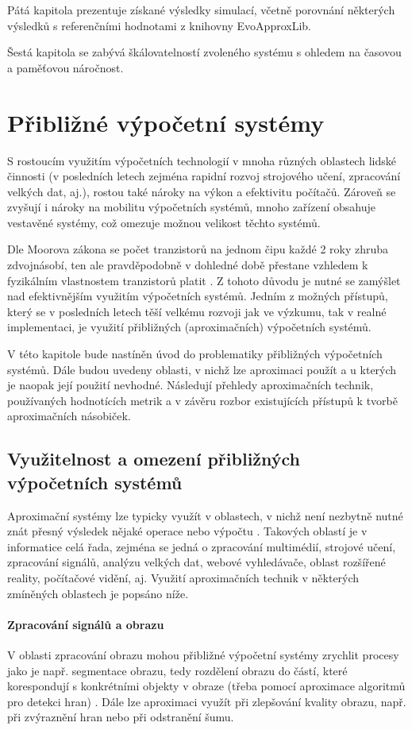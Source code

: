 Pátá kapitola prezentuje získané výsledky simulací, včetně porovnání některých výsledků s referenčními hodnotami z knihovny EvoApproxLib.

Šestá kapitola se zabývá škálovatelností zvoleného systému s ohledem na časovou a paměťovou náročnost.

\chapter{Přibližné výpočetní systémy} 
\label{acs}
S rostoucím využitím výpočetních technologií v mnoha různých oblastech lidské činnosti (v posledních letech zejména rapidní rozvoj strojového učení, zpracování velkých dat, aj.), rostou také nároky na výkon a efektivitu počítačů. Zároveň se zvyšují i nároky na mobilitu výpočetních systémů, mnoho zařízení obsahuje vestavěné systémy, což omezuje možnou velikost těchto systémů.

Dle Moorova zákona se počet tranzistorů na jednom čipu každé 2 roky zhruba zdvojnásobí, ten ale pravděpodobně v dohledné době přestane vzhledem k fyzikálním vlastnostem tranzistorů platit \cite{moore}. Z tohoto důvodu je nutné se zamýšlet nad efektivnějším využitím výpočetních systémů.
Jedním z možných přístupů, který se v posledních letech těší velkému rozvoji jak ve výzkumu, tak v realné implementaci, je využití přibližných (aproximačních) výpočetních systémů.

V této kapitole bude nastíněn úvod do problematiky přibližných výpočetních systémů. Dále budou uvedeny oblasti, v nichž lze aproximaci použít a u kterých je naopak její použití nevhodné. Následují přehledy aproximačních technik, používaných hodnotících metrik a v závěru rozbor existujících přístupů k tvorbě aproximačních násobiček.

\section{Využitelnost a omezení přibližných výpočetních systémů}
Aproximační systémy lze typicky využít v oblastech, v nichž není nezbytně nutné znát přesný výsledek nějaké operace nebo výpočtu \cite{emerging_paradigm}. Takových oblastí je v informatice celá řada, zejména se jedná o zpracování multimédií, strojové učení, zpracování signálů, analýzu velkých dat, webové vyhledávače, oblast rozšířené reality, počítačové vidění, aj. Využití aproximačních technik v některých zmíněných oblastech je popsáno níže.

\subsubsection{Zpracování signálů a obrazu}
V oblasti zpracování obrazu mohou přibližné výpočetní systémy zrychlit procesy jako je např. segmentace obrazu, tedy rozdělení obrazu do částí, které korespondují s konkrétními objekty v obraze (třeba pomocí aproximace algoritmů pro detekci hran) \cite{segmentation_tech}. Dále lze aproximaci využít při zlepšování kvality obrazu, např. při zvýraznění hran nebo při odstranění šumu.

